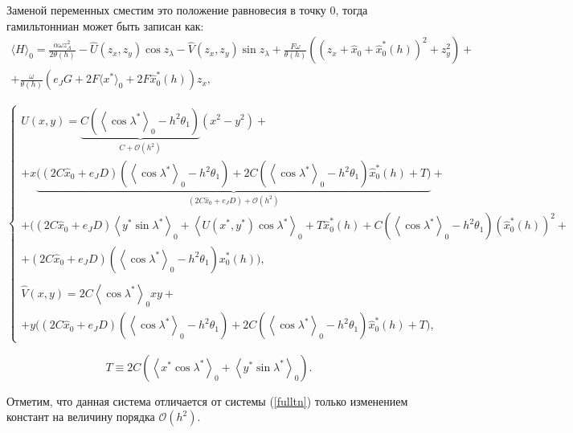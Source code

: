 Заменой переменных сместим это положение равновесия в точку $0$, тогда гамильтонниан может быть записан как:
\begin{multline}
\langle H \rangle_0 = \frac{\alpha \omega z_\Lambda^2}{2 \theta(h)} - \hat U(z_x,z_y)\cos{z_\lambda} - \hat V(z_x,z_y)\sin{z_\lambda} + \frac{F \omega}{\theta(h)} \left((z_x+\hat x_0 + \hat x_0^*(h))^2+z_y^2 \right) + \\ + \frac{\omega}{\theta(h)}\left(e_J G + 2F \langle x^* \rangle_0 + 2F \hat x_0^*(h) \right) z_x ,
\label{final_avg_ham}
\end{multline}

\begin{equation*}
    \begin{cases}
        \hat U (x,y) = \underbrace{C \left( \left\langle \cos \lambda^* \right\rangle_0 - h^2 \theta_1 \right)}_{C+\mathcal{O}(h^2)} (x^2-y^2) + \\ + x \underbrace{\big( (2C \hat x_0 + e_J D)\left( \left\langle \cos \lambda^* \right\rangle_0 - h^2 \theta_1 \right) + 2C \left( \left\langle \cos \lambda^* \right\rangle_0 - h^2 \theta_1 \right) \hat x_0^*(h) + T \big)}_{(2C \hat x_0 + e_J D)+\mathcal{O}(h^2)} + \\ + \big( (2C \hat x_0 + e_J D) \left\langle y^* \sin \lambda^* \right\rangle_0 + \left\langle U(x^*,y^*) \cos \lambda^* \right\rangle_0 + T \hat x_0^*(h) + C \left( \left\langle \cos \lambda^* \right\rangle_0 - h^2 \theta_1 \right) (\hat x_0^*(h))^2 + \\ +(2C \hat x_0 + e_J D)\left( \left\langle \cos \lambda^* \right\rangle_0 - h^2 \theta_1 \right) x_0^*(h) \big), \\
        \\
        \hat V(x,y) = 2C\left\langle \cos \lambda^* \right\rangle_0 xy + \\ + y \big( (2C \hat x_0 + e_J D)\left( \left\langle \cos \lambda^* \right\rangle_0 - h^2 \theta_1 \right) + 2C\left( \left\langle \cos \lambda^* \right\rangle_0 - h^2 \theta_1 \right) \hat x_0^*(h) + T \big),
    \end{cases}
\end{equation*} 

$$T \equiv 2C \left( \left\langle x^* \cos \lambda^* \right\rangle_0 + \left\langle y^* \sin \lambda^* \right\rangle_0 \right).$$

Отметим, что данная система отличается от системы (\ref{fulltn}) только изменением констант на величину порядка $\mathcal{O}(h^2)$.

